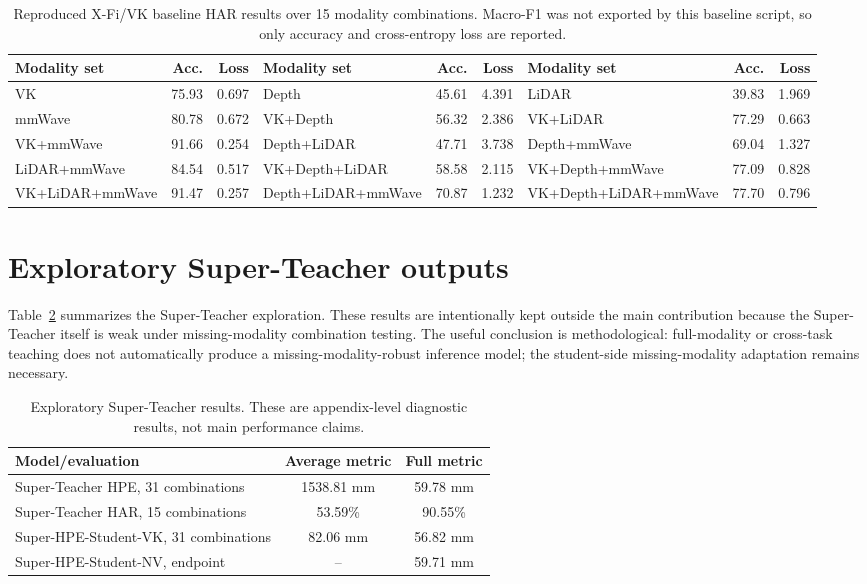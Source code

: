 \documentclass[preprint,12pt]{elsarticle}
\begin{document}
\begin{table}[h]
\centering
\caption{Reproduced X-Fi/VK baseline HAR results over 15 modality combinations. Macro-F1 was not exported by this baseline script, so only accuracy and cross-entropy loss are reported.}
\label{tab:ori_har_full_combinations}
\scriptsize
\begin{adjustbox}{width=\textwidth}
\begin{tabular}{lrr|lrr|lrr}
\toprule
Modality set & Acc. & Loss & Modality set & Acc. & Loss & Modality set & Acc. & Loss \\
\midrule
VK & 75.93 & 0.697 & Depth & 45.61 & 4.391 & LiDAR & 39.83 & 1.969 \\
mmWave & 80.78 & 0.672 & VK+Depth & 56.32 & 2.386 & VK+LiDAR & 77.29 & 0.663 \\
VK+mmWave & 91.66 & 0.254 & Depth+LiDAR & 47.71 & 3.738 & Depth+mmWave & 69.04 & 1.327 \\
LiDAR+mmWave & 84.54 & 0.517 & VK+Depth+LiDAR & 58.58 & 2.115 & VK+Depth+mmWave & 77.09 & 0.828 \\
VK+LiDAR+mmWave & 91.47 & 0.257 & Depth+LiDAR+mmWave & 70.87 & 1.232 & VK+Depth+LiDAR+mmWave & 77.70 & 0.796 \\
\bottomrule
\end{tabular}
\end{adjustbox}
\end{table}

\section{Exploratory Super-Teacher outputs}

Table~\ref{tab:superteacher_appendix} summarizes the Super-Teacher exploration. These results are intentionally kept outside the main contribution because the Super-Teacher itself is weak under missing-modality combination testing. The useful conclusion is methodological: full-modality or cross-task teaching does not automatically produce a missing-modality-robust inference model; the student-side missing-modality adaptation remains necessary.

\begin{table}[h]
\centering
\caption{Exploratory Super-Teacher results. These are appendix-level diagnostic results, not main performance claims.}
\label{tab:superteacher_appendix}
\begin{tabular}{lcc}
\toprule
Model/evaluation & Average metric & Full metric \\
\midrule
Super-Teacher HPE, 31 combinations & 1538.81 mm & 59.78 mm \\
Super-Teacher HAR, 15 combinations & 53.59\% & 90.55\% \\
Super-HPE-Student-VK, 31 combinations & 82.06 mm & 56.82 mm \\
Super-HPE-Student-NV, endpoint & -- & 59.71 mm \\
\bottomrule
\end{tabular}
\end{table}
\end{document}

